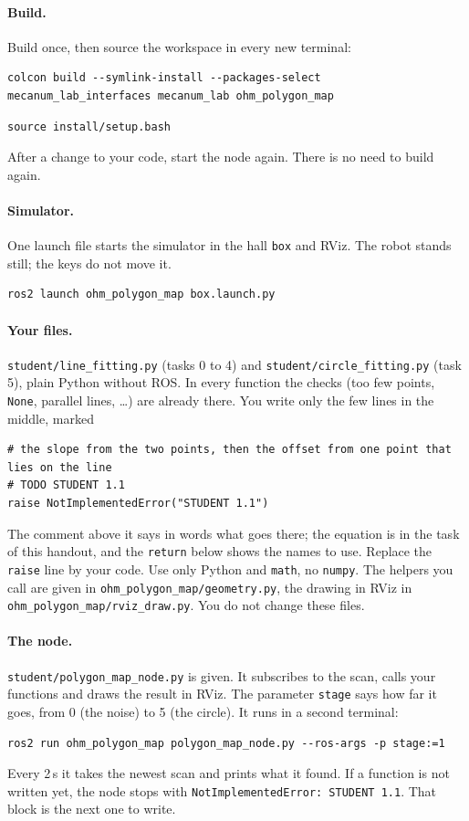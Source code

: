 \documentclass[11pt,a4paper,parskip=half]{scrartcl}
\newcommand{\thema}[1]{\texttt{#1}}
\newcommand{\datei}[1]{\texttt{#1}}
\begin{document}
\paragraph{Build.} Build once, then source the workspace in every new terminal:
\begin{lstlisting}
colcon build --symlink-install --packages-select mecanum_lab_interfaces mecanum_lab ohm_polygon_map
\end{lstlisting}
\begin{lstlisting}
source install/setup.bash
\end{lstlisting}
After a change to your code, start the node again. There is no need to build again.

\paragraph{Simulator.} One launch file starts the simulator in the hall \thema{box} and RViz. The robot
stands still; the keys do not move it.
\begin{lstlisting}
ros2 launch ohm_polygon_map box.launch.py
\end{lstlisting}

\paragraph{Your files.} \datei{student/line\_fitting.py} (tasks 0 to 4) and
\datei{student/circle\_fitting.py} (task 5), plain Python without ROS. In every function the checks
(too few points, \thema{None}, parallel lines, \dots) are already there. You write only the few lines
in the middle, marked
\begin{lstlisting}
# the slope from the two points, then the offset from one point that lies on the line
# TODO STUDENT 1.1
raise NotImplementedError("STUDENT 1.1")
\end{lstlisting}
The comment above it says in words what goes there; the equation is in the task of this handout, and
the \thema{return} below shows the names to use. Replace the \thema{raise} line by your code. Use only Python
and \thema{math}, no \thema{numpy}. The helpers you call are given in
\datei{ohm\_polygon\_map/geometry.py}, the drawing in RViz in \datei{ohm\_polygon\_map/rviz\_draw.py}.
You do not change these files.

\paragraph{The node.} \datei{student/polygon\_map\_node.py} is given. It subscribes to the scan, calls
your functions and draws the result in RViz. The parameter \thema{stage} says how far it goes, from 0 (the
noise) to 5 (the circle). It runs in a second terminal:
\begin{lstlisting}
ros2 run ohm_polygon_map polygon_map_node.py --ros-args -p stage:=1
\end{lstlisting}
Every 2\,s it takes the newest scan and prints what it found. If a function is not written yet, the node
stops with \thema{NotImplementedError: STUDENT 1.1}. That block is the next one to write.
\end{document}
